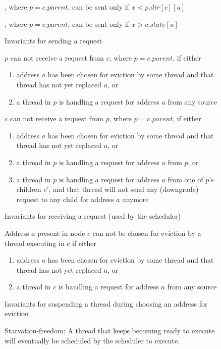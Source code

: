 \begin{figure}
\begin{inv}
, where $p = c.parent$, can be sent only if $x < p.dir[c][a]$
\label{pSendReqPre}
\end{inv}
\begin{inv}
, where $p = c.parent$, can be sent only if $x > c.state[a]$
\label{cSendReqPre}
\end{inv}
\caption{Invariants for sending a request}
\label{sendReq}
\end{figure}

\begin{figure}
\begin{inv}
$p$ can not receive a request  from $c$, where $p = c.parent$,
if either
\begin{enumerate}
\item address $a$ has been chosen for eviction by some thread and that thread
has not yet replaced $a$, or
\item a thread in $p$ is handling a request for address
$a$ from any source
\end{enumerate}
\label{pHandleReq}
\end{inv}
\begin{inv}
$c$ can not receive a request  from $p$, where $p = c.parent$,
if either
\begin{enumerate}
\item address $a$ has been chosen for eviction by some thread and that thread
has not yet replaced $a$, or
\item a thread in $p$ is handling a request for address
$a$ from $p$, or
\item a thread in $p$ is handling a request for address
$a$ from one of $p$'s children $c'$, and that thread will not send any
(downgrade) request to any child for address $a$ anymore
\end{enumerate}
\label{cHandleReq}
\end{inv}
\caption{Invariants for receiving a request (used by the scheduler)}
\label{recvReq}
\end{figure}

\begin{figure}
\begin{inv}
Address $a$ present in node $c$ can not be chosen for eviction by a thread
executing in $c$ if either
\begin{enumerate}
\item address $a$ has been chosen for eviction by some thread and that thread
has not yet replaced $a$, or
\item a thread in $c$ is handling a request for address
$a$ from any source
\end{enumerate}
\label{evict}
\caption{Invariants for suspending a thread during choosing an address for eviction}
\end{inv}
\end{figure}

\begin{figure}
\begin{inv}
Starvation-freedom: A thread that keeps becoming ready to execute will
eventually be scheduled by the scheduler to execute.
\end{inv}
\end{figure}

